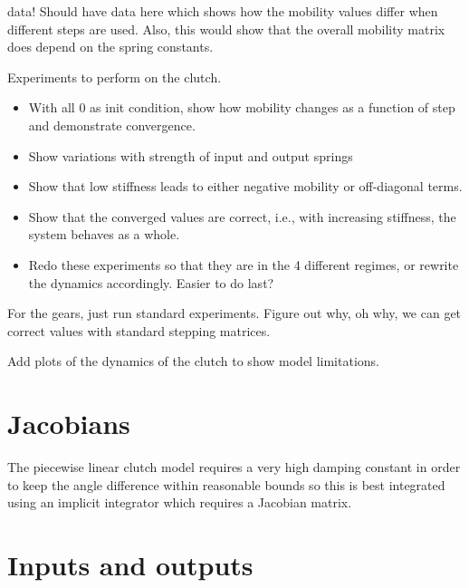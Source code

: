\documentclass[10pt,notitlepage,abstracton]{scrartcl}
\theoremstyle{plain}
\theoremstyle{plain}
\theoremstyle{plain}
\begin{document}
\begin{anfxnote}{data!}
  Should have data here which shows how the mobility values differ when
  different steps are used.  Also, this would show that the overall
  mobility matrix does depend on the spring constants.  


  Experiments to perform on the clutch. 
  \begin{itemize}
  \item  With all $0$ as init condition, show how mobility changes as a
    function of step and demonstrate convergence. 
  \item Show variations with strength of input and output springs 
  \item Show that low stiffness leads to either negative mobility or
    off-diagonal terms. 
  \item Show that the converged values are correct, i.e., with increasing
    stiffness, the system behaves as a whole. 
  \item Redo these experiments so that they are in the 4 different regimes,
    or rewrite the dynamics accordingly.  Easier to do last? 
  \end{itemize}


  For the gears, just run standard experiments.  Figure out why, oh why, we
  can get correct values with standard stepping matrices. 

  Add plots of the dynamics of the clutch to show model limitations. 

\end{anfxnote}

\section{Jacobians}
\label{sec:jacobians}

The piecewise linear clutch model requires a very high damping constant in
order to keep the angle difference within reasonable bounds so this is best
integrated using an implicit integrator which requires a Jacobian matrix. 


\section{Inputs and outputs}
\label{sec:inputs-outputs}
\end{document}
